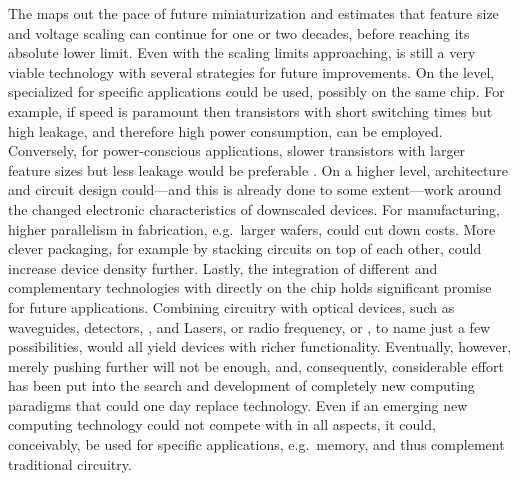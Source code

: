 The  \cite{itrs2011} maps out the pace of future 
miniaturization and estimates that feature size and voltage scaling can continue
for one or two decades, before reaching its absolute lower limit. Even with the
scaling limits approaching,  is still a very viable technology with
several strategies for future improvements. On the  level,
specialized  for specific applications could be used, possibly on
the same chip. For example, if speed is paramount then transistors with short
switching times but high leakage, and therefore high power consumption, can be
employed. Conversely, for power-conscious applications, slower transistors with
larger feature sizes but less leakage would be preferable
\cite{cavin2012science}. On a higher level, architecture and circuit design
could---and this is already done to some extent---work around the changed
electronic characteristics of downscaled devices. For manufacturing, higher
parallelism in fabrication, e.g.~larger wafers, could cut down costs. More
clever packaging, for example by stacking circuits on top of each other, could
increase device density further. Lastly, the integration of different and
complementary technologies with  directly on the chip holds
significant promise for future applications.  Combining  circuitry
with optical devices, such as waveguides, detectors, , and Lasers,
or radio frequency, or , to name just a few possibilities, would all
yield devices with richer functionality. Eventually, however, merely pushing
 further will not be enough, and, consequently, considerable effort
has been put into the search and development of completely new computing
paradigms that could one day replace  technology. Even if an emerging
new computing technology could not compete with  in all aspects, it
could, conceivably, be used for specific applications, e.g.~memory, and thus
complement traditional circuitry.


